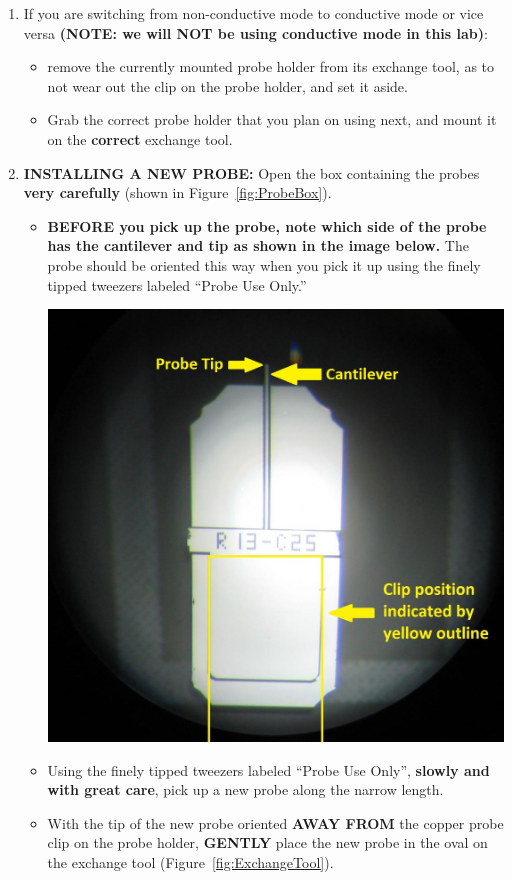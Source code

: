 \documentclass{../lab}
\begin{document}
\begin{enumerate}
    \item If you are switching from non-conductive mode to conductive mode or vice versa \textbf{(NOTE: we will NOT be using conductive mode in this lab)}:
    \begin{itemize}
        \item remove the currently mounted probe holder from its exchange tool, as to not wear out the clip on the probe holder, and set it aside.

        \item Grab the correct probe holder that you plan on using next, and mount it on the \textbf{correct} exchange tool.
    \end{itemize}
    
    \item \textbf{INSTALLING A NEW PROBE:}  Open the box containing the probes \textbf{very carefully} (shown in Figure~\ref{fig:ProbeBox}).
    
    \begin{itemize}
        \item \textbf{BEFORE you pick up the probe, note which side of the probe has the cantilever and tip as shown in the image below.}  The probe should be oriented this way when you pick it up using the finely tipped tweezers labeled ``Probe Use Only.''
    
        \begin{center}
            \href{http://experimentationlab.berkeley.edu/sites/default/files/AFMImages/AFMprobe.JPG}{\includegraphics[width=0.5\linewidth]{images/AFMprobe.JPG}}
        \end{center}
    
        \item Using the finely tipped tweezers labeled ``Probe Use Only'', \textbf{slowly and with great care}, pick up a new probe along the narrow length.
    
        \item With the tip of the new probe oriented \textbf{AWAY FROM} the copper probe clip on the probe holder, \textbf{GENTLY} place the new probe in the oval on the exchange tool (Figure~\ref{fig:ExchangeTool}).
    \end{itemize}
    

\end{enumerate}
\end{document}
